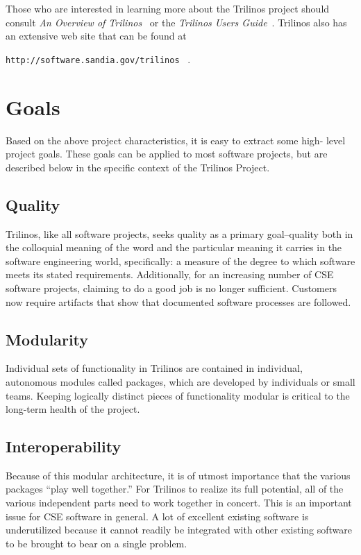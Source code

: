 \documentclass[12pt,relax]{article}
\newcommand{\InlineDirectory}[1]{
  {\hspace{0.01 in}} {\tt #1} {\hspace{0.01 in}}}
\begin{document}
Those who are interested in learning more about the Trilinos project should
consult {\it An Overview of Trilinos}~\cite{Trilinos-Overview} or the
{\it Trilinos Users Guide}~\cite{Trilinos-Users-Guide}.  Trilinos also has an
extensive web site that can be found at \newline
\InlineDirectory{http://software.sandia.gov/trilinos}~\cite{Trilinos-home-page}.


\section{Goals}
\label{Section:Goals}

Based on the above project characteristics, it is easy to extract some high-
level project goals.  These goals can be applied to most software projects,
but are described below in the specific context of the Trilinos Project.

\subsection{Quality}
Trilinos, like all software projects, seeks quality as a primary goal--quality
both in the colloquial meaning of the word and the particular meaning it
carries in the software engineering world, specifically:  a measure of the
degree to which software meets its stated requirements.  Additionally, for an 
increasing number of CSE software projects, claiming to do a good job is no 
longer sufficient.  Customers now require artifacts that show that documented 
software processes are followed.

\subsection{Modularity}
Individual sets of functionality in Trilinos are contained in individual,
autonomous modules called packages, which are developed by individuals or small
teams.  Keeping logically distinct pieces of functionality modular is critical
to the long-term health of the project.  

\subsection{Interoperability}
Because of this modular architecture, it is of utmost importance that the
various packages ``play well together.''  For Trilinos to realize its full
potential, all of the various independent parts need to work together in
concert.  This is an important issue for CSE software in general.  A lot of
excellent existing software is underutilized because it cannot readily be
integrated with other existing software to be brought to bear on a single
problem.
\end{document}
